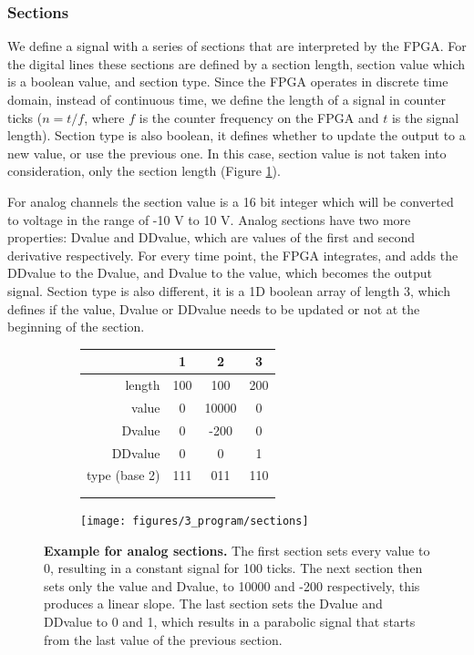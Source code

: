 \documentclass{diploma_style}
\begin{document}
\subsubsection{Sections}
We define a signal with a series of sections that are interpreted by the FPGA. For the digital lines these sections are defined by a section length, section value which is a boolean value, and section type. Since the FPGA operates in discrete time domain, instead of continuous time, we define the length of a signal in counter ticks ($n=t/f$, where $f$ is the counter frequency on the FPGA and $t$ is the signal length). Section type is also boolean, it defines whether to update the output to a new value, or use the previous one. In this case, section value is not taken into consideration, only the section length (Figure \ref{fig:sections}).

For analog channels the section value is a 16 bit integer which will be converted to voltage in the range of -10 V to 10 V. Analog sections have two more properties: Dvalue and DDvalue, which are values of the first and second derivative respectively. For every time point, the FPGA integrates, and adds the DDvalue to the Dvalue, and Dvalue to the value, which becomes the output signal. Section type is also different, it is a 1D boolean array of length 3, which defines if the value, Dvalue or DDvalue needs to be updated or not at the beginning of the section.

\begin{figure}[htbp]
\centering
\begin{subfigure}[b]{0.49\textwidth}
		\centering
		\begin{tabular}{r|c|c|c}
			& 1 & 2 & 3 \\ \hline \hline
	length  & 100 & 100 & 200 \\
	value   & 0 & 10000 & 0 \\
	Dvalue  & 0 & -200 & 0 \\
	DDvalue & 0 & 0 & 1 \\
	type (base 2) & 111 & 011 & 110 \\
	\multicolumn{4}{c}{ }\\ %
\multicolumn{4}{c}{ }\\ %
\end{tabular}
		\caption{}
	\end{subfigure}	
	\begin{subfigure}[b]{0.49\textwidth}
		\centering
		\texttt{[image: figures/3\_program/sections]}
		\caption{}
	\end{subfigure}
\caption{\textbf{Example for analog sections.} The first section sets every value to 0, resulting in a constant signal for 100 ticks. The next section then sets only the value and Dvalue, to 10000 and -200 respectively, this produces a linear slope. The last section sets the Dvalue and DDvalue to 0 and 1, which results in a parabolic signal that starts from the last value of the previous section.}
\label{fig:sections}
\end{figure}
\end{document}
